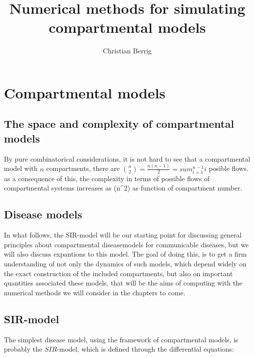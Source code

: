 \documentclass{article}
\author{Christian Berrig}
\title{Numerical methods for simulating compartmental models}
\begin{document}

\maketitle



\section{Compartmental models} \label{sec:compartmental models}

\subsection{The space and complexity of compartmental models}
By pure combinatorical considerations, it is not hard to see that a compartmental model with $n$ compartments, there are $\binom{n}{2} = \frac{n(n-1)}{2} = sum_{i=1}^{n-1} i$ posible flows. 
as a consequence of this, the complexity in terms of possible flows of compartmental systems increases as \bigo (n^{2}) as function of compartment number. 

\subsection{Disease models}
In what follows, the SIR-model will be our starting point for discussing general principles about compartmental diseasemodels for communicable diseases, but we will also discuss expantions to this model. The goal of doing this, is to get a firm understanding of not only the dynamics of such models, which depend widely on the exact construction of the included compartments, but also on important quantities associated these models, that will be the aims of computing with the numerical methods we will consider in the chapters to come.

\subsection{SIR-model}
The simplest disease model, using the framework of compartmental models, is probably the $SIR$-model, which is defined through the differential equations:
\end{document}
